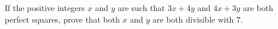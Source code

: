 If the positive integers $x$ and $y$ are such that $3x + 4y$ and $4x + 3y$ are both perfect squares, prove that both $x$ and $y$ are both divisible with $7$.